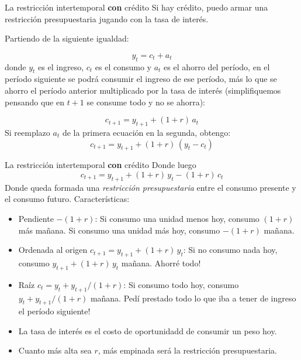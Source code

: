\documentclass{beamer}
\begin{document}
\begin{frame}{La restricción intertemporal \textbf{con} crédito}
    \small 
    Si hay crédito, puedo armar una restricción presupuestaria jugando con la tasa de interés.

    Partiendo de la siguiente igualdad:

    \[y_t = c_t + a_t\]
    donde \(y_t\) es el ingreso, \(c_t\) es el consumo y \(a_t\) es el ahorro del período, en el período siguiente se podrá consumir el ingreso de ese período, más lo que se ahorro el período anterior multiplicado por la tasa de interés (simplifiquemos pensando que en $t+1$ se consume todo y no se ahorra):

    \[c_{t+1} = y_{t+1} + (1+r)\,a_t\]
    Si reemplazo $a_t$ de la primera ecuación en la segunda, obtengo:
    \[c_{t+1} = y_{t+1} + (1+r)\,(y_t - c_t)\]
\end{frame}

\begin{frame}{La restricción intertemporal \textbf{con} crédito}
    \small 
    Donde luego
    \[c_{t+1} = y_{t+1} + (1+r)\,y_t - (1+r)\,c_t\]
    Donde queda formada una \textit{restricción presupuestaria} entre el consumo presente y el consumo futuro. Características:
    \begin{itemize}
        \item Pendiente $-(1+r)$: Si consumo una unidad menos hoy, consumo $(1+r)$ más mañana. Si consumo una unidad más hoy, consumo $-(1+r)$ mañana.
        \item Ordenada al origen $c_{t+1} = y_{t+1} + (1+r)\,y_t$: Si no consumo nada hoy, consumo $y_{t+1} + (1+r)\,y_t$ mañana. Ahorré todo!
        \item Raíz $c_t = y_t + y_{t+1}/(1+r)$: Si consumo todo hoy, consumo $y_t + y_{t+1}/(1+r)$ mañana. Pedí prestado todo lo que iba a tener de ingreso el período siguiente!
        \item La tasa de interés es el costo de oportunidadd de consumir un peso hoy.
        \item Cuanto más alta sea $r$, más empinada será la restricción presupuestaria.
    \end{itemize}
\end{frame}
\end{document}
